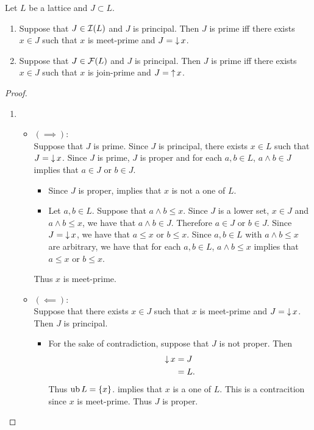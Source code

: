 \documentclass{book}
\begin{document}
	\begin{ex}
		Let $L$ be a lattice and $J \subset L$.
		\begin{enumerate}
			\item Suppose that $J \in \mathcal{I}(L)$ and $J$ is principal. Then $J$ is prime iff there exists $x \in J$ such that $x$ is meet-prime and $J = \operatorname{\downarrow} x$.
			\item Suppose that $J \in \mathcal{F}(L)$ and $J$ is principal. Then $J$ is prime iff there exists $x \in J$ such that $x$ is join-prime and $J = \operatorname{\uparrow} x$.
		\end{enumerate}
	\end{ex}
	
	\begin{proof}\
		\begin{enumerate}
			\item 
			\begin{itemize}
				\item $(\implies)$: \\
				Suppose that $J$ is prime. Since $J$ is principal, there exists $x \in L$ such that $J = \operatorname{\downarrow} x$. Since $J$ is prime, $J$ is proper and for each $a,b \in L$, $a \wedge b \in J$ implies that $a \in J$ or $b \in J$. 
				\begin{itemize}
					\item Since $J$ is proper,  implies that $x$ is not a one of $L$. 
					\item Let $a,b \in L$. Suppose that $a \wedge b \leq x$. Since $J$ is a lower set, $x \in J$ and $a \wedge b \leq x$, we have that $a \wedge b \in J$. Therefore $a \in J$ or $b \in J$. Since $J = \operatorname{\downarrow} x$, we have that $a \leq x$ or $b \leq x$. Since $a,b \in L$ with $a \wedge b \leq x$ are arbitrary, we have that for each $a, b \in L$, $a \wedge b \leq x$ implies that $a \leq x$ or $b \leq x$. 
				\end{itemize}
				Thus $x$ is meet-prime. 
				\item $(\impliedby)$: \\
				Suppose that there exists $x \in J$ such that $x$ is meet-prime and $J = \operatorname{\downarrow} x$. Then $J$ is principal.
				\begin{itemize}
					\item For the sake of contradiction, suppose that $J$ is not proper. Then 
					\begin{align*}
						\operatorname{\downarrow} x
						& = J \\
						& = L.
					\end{align*}
					Thus $\operatorname{ub} L = \{x\}$.  implies that $x$ is a one of $L$. This is a contracition since $x$ is meet-prime. Thus $J$ is proper. 

\end{itemize}
\end{itemize}
\end{enumerate}
\end{proof}
\end{document}
